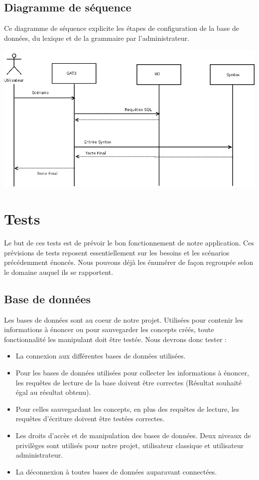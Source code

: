 \documentclass[12pt]{report}
\begin{document}
\subsection{Diagramme de séquence}

	Ce diagramme de séquence explicite les étapes de configuration de la base de données, du lexique et de la grammaire par l'administrateur. 

	\includegraphics[scale=0.4]{diasequence2.png}

\section{Tests}

Le but de ces tests est de prévoir le bon fonctionnement de notre application. Ces prévisions de tests reposent essentiellement sur les besoins et les scénarios précédemment énoncés. Nous pouvons déjà les énumérer de façon regroupée selon le domaine auquel ils se rapportent.

\subsection{Base de données}

Les bases de données sont au coeur de notre projet. Utilisées pour contenir les informations à énoncer ou pour sauvegarder les concepts créés, toute fonctionnalité les manipulant doit être testée.
Nous devrons donc tester :
	\begin{itemize}
	\item La connexion aux différentes bases de données utilisées. 
	\item Pour les bases de données utilisées pour collecter les informations à énoncer, les requêtes de lecture de la base doivent être correctes (Résultat souhaité égal au résultat obtenu).
	\item Pour celles sauvegardant les concepts, en plus des requêtes de lecture, les requêtes d'écriture doivent être testées correctes. 
	\item Les droits d'accès et de manipulation des bases de données. Deux niveaux de privilèges sont utilisés pour notre projet, utilisateur classique et utilisateur administrateur. 
	\item La déconnexion à toutes bases de données auparavant connectées.

	\end{itemize}
\end{document}
